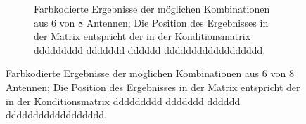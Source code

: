 \begin{figure} [h]
\begin{subfigure}[t]{0.4\textwidth}
                 \caption{ Farbkodierte Ergebnisse der möglichen Kombinationen aus 6 von 8 Antennen; Die Position des Ergebnisses in der Matrix entspricht der in der Konditionsmatrix ddddddddd ddddddd dddddd dddddddddddddddddd.}
                 \label{fig:Results}
         \end{subfigure}
%
\end{figure}
